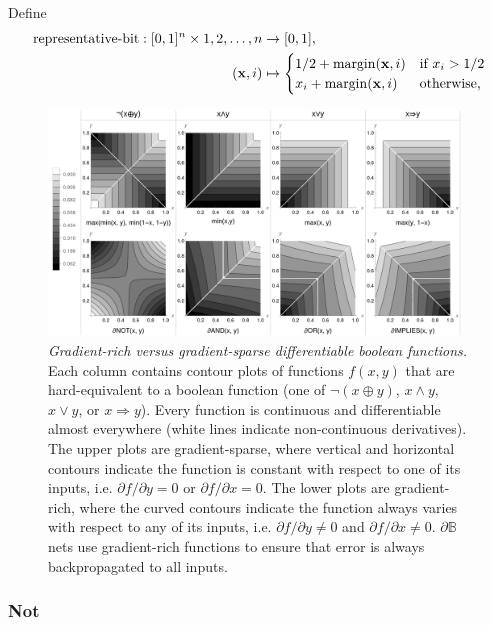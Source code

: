 \documentclass{article} %
\begin{document}
Define 
\begin{equation*}
\begin{aligned}
\operatorname{representative-bit}: [0,1]^{n} \times 1,2,\dots,n &\to [0,1],\\
({\bf x}, i) &\mapsto 
\begin{cases}
1/2 + \operatorname{margin}({\bf x}, i) & \text{if } x_{i} > 1/2 \\
x_{i} + \operatorname{margin}({\bf x}, i) & \text{otherwise,}
\end{cases}
\end{aligned}
\end{equation*}

\begin{figure}[t]
	\centering
	\includegraphics[trim=0pt 0pt 0pt 0pt, clip, width=0.975\textwidth]{logic-gates.png}
	\caption{{\em Gradient-rich versus gradient-sparse differentiable boolean functions.} Each column contains contour plots of functions $f(x,y)$ that are hard-equivalent to a boolean function (one of $\neg(x \oplus y)$, $x \wedge y$, $x \vee y$, or $x \Rightarrow y$). Every function is continuous and differentiable almost everywhere (white lines indicate non-continuous derivatives). The upper plots are gradient-sparse, where vertical and horizontal contours indicate the function is constant with respect to one of its inputs, i.e. $\partial f/\partial y = 0$ or $\partial f/\partial x = 0$. The lower plots are gradient-rich, where the curved contours indicate the function always varies with respect to any of its inputs, i.e. $\partial f/\partial y \neq 0$ and $\partial f/\partial x \neq 0$. $\partial \mathbb{B}$ nets use gradient-rich functions to ensure that error is always backpropagated to all inputs.} 
	\label{fig:and-plot}
\end{figure}

\subsubsection{Not}
\end{document}
